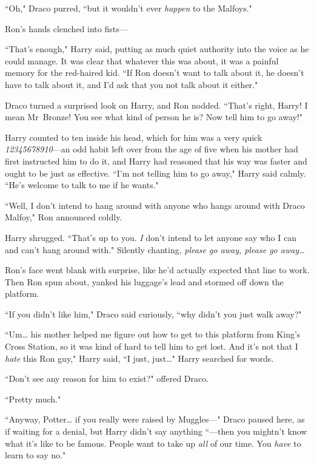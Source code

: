 ``Oh," Draco purred, ``but it wouldn't ever \emph{happen} to the Malfoys."

Ron's hands clenched into fists—

``That's enough," Harry said, putting as much quiet authority into the voice as he could manage. It was clear that whatever this was about, it was a painful memory for the red-haired kid. ``If Ron doesn't want to talk about it, he doesn't have to talk about it, and I'd ask that you not talk about it either."

Draco turned a surprised look on Harry, and Ron nodded. ``That's right, Harry! I mean Mr~Bronze! You see what kind of person he is? Now tell him to go away!"

Harry counted to ten inside his head, which for him was a very quick \emph{12345678910}—an odd habit left over from the age of five when his mother had first instructed him to do it, and Harry had reasoned that his way was faster and ought to be just as effective. ``I'm not telling him to go away," Harry said calmly. ``He's welcome to talk to me if he wants."

``Well, I don't intend to hang around with anyone who hangs around with Draco Malfoy," Ron announced coldly.

Harry shrugged. ``That's up to you. \emph{I} don't intend to let anyone say who I can and can't hang around with." Silently chanting, \emph{please go away, please go away{\ldots}}

Ron's face went blank with surprise, like he'd actually expected that line to work. Then Ron spun about, yanked his luggage's lead and stormed off down the platform.

``If you didn't like him," Draco said curiously, ``why didn't you just walk away?"

``Um{\ldots} his mother helped me figure out how to get to this platform from King's Cross Station, so it was kind of hard to tell him to get lost. And it's not that I \emph{hate} this Ron guy," Harry said, ``I just, just{\ldots}" Harry searched for words.

``Don't see any reason for him to exist?" offered Draco.

``Pretty much."

``Anyway, Potter{\ldots} if you really were raised by Muggles—" Draco paused here, as if waiting for a denial, but Harry didn't say anything ``—then you mightn't know what it's like to be famous. People want to take up \emph{all} of our time. You \emph{have} to learn to say no."

